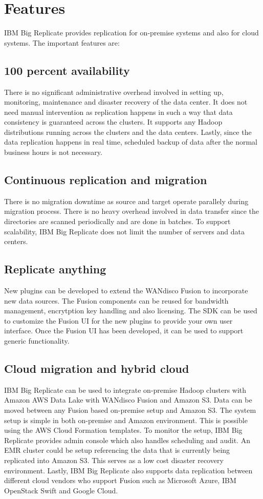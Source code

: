 \section{Features}

IBM Big Replicate provides replication for on-premise systems and also for 
cloud systems. The important features are:

\subsection{100 percent availability}
There is no significant administrative overhead involved in setting up,
monitoring, maintenance and disaster recovery of the data center. It does not
need manual intervention as replication happens in such a way that data
consistency is guaranteed across the clusters. It supports any Hadoop
distributions running across the clusters and the data centers. Lastly, since
the data replication happens in real time, scheduled backup of data after the 
normal business hours is not necessary.

\subsection{Continuous replication and migration}
There is no migration downtime as source and target operate parallely during 
migration process. There is no heavy overhead involved in data transfer since
the directories are scanned periodically and are done in batches. To support 
scalability, IBM Big Replicate does not limit the number of servers and data
centers.

\subsection{Replicate anything}
New plugins can be developed to extend the WANdisco Fusion to incorporate new
data sources. The Fusion components can be reused for bandwidth management,
encrytption key handling and also licensing. The SDK can be used to customize
the Fusion UI for the new plugins to provide your own user interface. Once the 
Fusion UI has been developed, it can be used to support generic functionality.

\subsection{Cloud migration and hybrid cloud}
IBM Big Replicate can be used to integrate on-premise Hadoop clusters with 
Amazon AWS Data Lake with WANdisco Fusion and Amazon S3. Data can be moved
between any Fusion based on-premise setup and Amazon S3. The system setup is
simple in both on-premise and Amazon environment. This is possible using the 
AWS Cloud Formation templates. To monitor the setup, IBM Big Replicate provides
admin console which also handles scheduling and audit. An EMR cluster could be
setup referencing the data that is currently being replicated into Amazon S3.
This serves as a low cost disaster recovery environment. Lastly, IBM Big 
Replicate also supports data replication between different cloud vendors who
support Fusion such as Microsoft Azure, IBM OpenStack Swift and Google Cloud.

